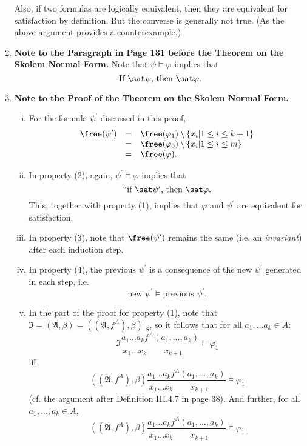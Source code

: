 \begin{enumerate}[1.]
Also, if two formulas are logically equivalent, then they are equivalent for satisfaction by definition. But the converse is generally not true. (As the above argument provides a counterexample.)
%
\item \textbf{Note to the Paragraph in Page 131 before the Theorem on the Skolem Normal Form.} Note that $\psi \models \varphi$ implies that
\[
\mbox{If $\sat \psi$, then $\sat \varphi$}.
\]
%
\item \textbf{Note to the Proof of the Theorem on the Skolem Normal Form.}
\begin{enumerate}[(i)]
\item For the formula $\psi^\prime$ discussed in this proof,
\[
\begin{array}{lll}
\free(\psi^\prime) & = & \free(\varphi_1) \setminus \{x_i | 1 \leq i \leq k + 1 \} \\
\                  & = & \free(\varphi_0) \setminus \{x_i | 1 \leq i \leq m \} \\
\                  & = & \free(\varphi).
\end{array}
\]
\item In property (2), again, $\psi^\prime \models \varphi$ implies that
\[
\mbox{``if $\sat \psi^\prime$, then $\sat \varphi$}.
\]
This, together with property (1), implies that $\varphi$ and $\psi^\prime$ are equivalent for satisfaction.
\item In property (3), note that $\free(\psi^\prime)$ remains the same (i.e. an \emph{invariant}) after each induction step.
\item In property (4), the previous $\psi^\prime$ is a consequence of the new $\psi^\prime$ generated in each step, i.e.
\[
\mbox{new } \psi^\prime \models \mbox{previous } \psi^\prime.
\]
\item In the part of the proof for property (1), note that $\mathfrak{I} = (\mathfrak{A}, \beta) = ((\mathfrak{A}, f^A), \beta) |_S$, so it follows that for all $a_1, \ldots a_k \in A$:
\[
\mathfrak{I}\displaystyle\frac{a_1 \ldots a_k f^A(a_1, \ldots, a_k)}{x_1 \ldots x_k \phantom{f^Aa_1} x_{k+1} \phantom{,a_k)}} \models \varphi_1
\]
iff
\[
((\mathfrak{A}, f^A), \beta)\displaystyle\frac{a_1 \ldots a_k f^A(a_1, \ldots, a_k)}{x_1 \ldots x_k \phantom{f^Aa_1} x_{k+1} \phantom{,a_k)}} \models \varphi_1
\]
(cf. the argument after Definition III.4.7 in page 38). And further, for all $a_1, \ldots, a_k \in A$,
\[
((\mathfrak{A}, f^A), \beta)\displaystyle\frac{a_1 \ldots a_k f^A(a_1, \ldots, a_k)}{x_1 \ldots x_k \phantom{f^Aa_1} x_{k+1} \phantom{,a_k)}} \models \varphi_1
\]
\end{enumerate}
\end{enumerate}

